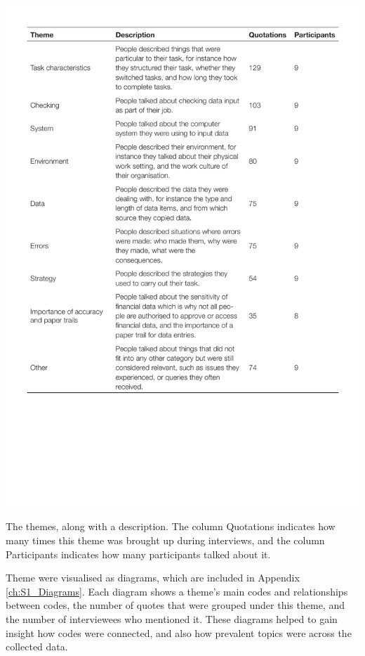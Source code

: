 \begin{table}[htp]
\centering
\includegraphics[width=\textwidth]{images/ch12/ch12-1_Themes.pdf}
    \caption[Study 1 Themes]{The themes, along with a description. The column Quotations indicates how many times this theme was brought up during interviews, and the column Participants indicates how many participants talked about it.}
    \label{table:ch3_themes}
\end{table}

Theme were visualised as diagrams, which are included in Appendix \ref{ch:S1_Diagrams}. Each diagram shows a theme's main codes and relationships between codes, the number of quotes that were grouped under this theme, and the number of interviewees who mentioned it. These diagrams helped to gain insight how codes were connected, and also how prevalent topics were across the collected data. 

